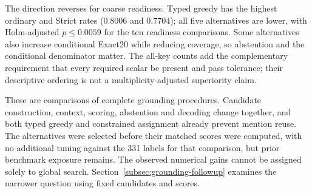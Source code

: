 \documentclass[pdflatex,sn-basic,Numbered]{sn-jnl}
\begin{document}
The direction reverses for coarse readiness. Typed greedy has the highest ordinary and Strict rates ($0.8006$ and $0.7704$); all five alternatives are lower, with Holm-adjusted $p\leq0.0059$ for the ten readiness comparisons. Some alternatives also increase conditional Exact20 while reducing coverage, so abstention and the conditional denominator matter. The all-key counts add the complementary requirement that every required scalar be present and pass tolerance; their descriptive ordering is not a multiplicity-adjusted superiority claim.

These are comparisons of complete grounding procedures. Candidate construction, context, scoring, abstention and decoding change together, and both typed greedy and constrained assignment already prevent mention reuse. The alternatives were selected before their matched scores were computed, with no additional tuning against the 331 labels for that comparison, but prior benchmark exposure remains. The observed numerical gains cannot be assigned solely to global search. Section~\ref{subsec:grounding-followup} examines the narrower question using fixed candidates and scores.
\end{document}
